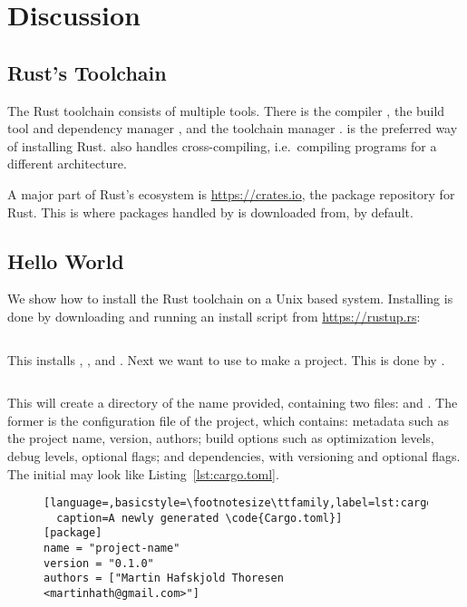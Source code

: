 \documentclass[b5paper]{report}
\begin{document}
\chapter{Discussion}

\begin{appendices}
  \chapter{Rust's Toolchain}
  The Rust toolchain consists of multiple tools.
  There is the compiler \rustc{}, the build tool and dependency manager \cargo{},
  and the toolchain manager \rustup.
  \rustup{} is the preferred way of installing Rust.
  \rustup{} also handles cross-compiling, i.e.\ compiling programs for a different
  architecture.

  A major part of Rust's ecosystem is \url{https://crates.io}, the package repository
  for Rust. This is where packages handled by \cargo{} is downloaded from, by default.

  \section{Hello World}
  We show how to install the Rust toolchain on a Unix based system.
  Installing \rustup{} is done by downloading and running an install script from
  \url{https://rustup.rs}:
  \begin{lstlisting}[language=Bash,numbers=none]
% curl https://sh.rustup.rs -sSf | sh
  \end{lstlisting}
  This installs \rustup{}, \cargo{}, and \rustc{}.
  Next we want to use \cargo{} to make a project. This is done by .
  \begin{lstlisting}[language=Bash,numbers=none]
% cargo init --bin <name-of-project>
  \end{lstlisting}
  This will create a directory of the name provided, containing two files:
   and .
  The former is the configuration file of the project, which contains:
  metadata such as the project name, version, authors;
  build options such as optimization levels, debug levels, optional flags;
  and dependencies, with versioning and optional flags.
  The initial  may look like Listing~\ref{lst:cargo.toml}.
  \begin{figure}[ht]
  \begin{lstlisting}[language=,basicstyle=\footnotesize\ttfamily,label=lst:cargo.toml,
  caption=A newly generated \code{Cargo.toml}]
[package]
name = "project-name"
version = "0.1.0"
authors = ["Martin Hafskjold Thoresen <martinhath@gmail.com>"]


\end{lstlisting}
\end{figure}
\end{appendices}
\end{document}
